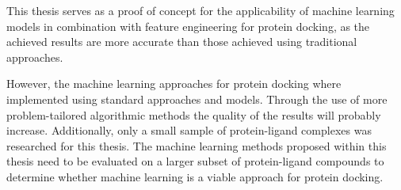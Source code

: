 This thesis serves as a proof of concept for the applicability of machine learning models in combination with feature engineering for protein docking, as the achieved results 
are more accurate than those achieved using traditional approaches.

However, the machine learning approaches for protein docking where implemented using standard approaches and models. 
Through the use of more problem-tailored algorithmic methods the quality of the results will probably increase. Additionally, only a small sample 
of protein-ligand complexes was researched for this thesis. The machine learning methods proposed within this thesis need to be evaluated on a larger subset of 
protein-ligand compounds to determine whether machine learning is a viable approach for protein docking.
